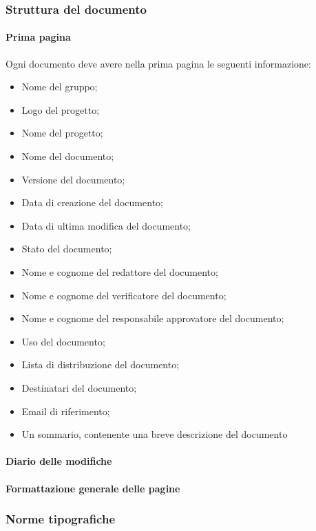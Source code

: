 \subsubsection{Struttura del documento}
\paragraph{Prima pagina}
Ogni documento deve avere nella prima pagina le seguenti informazione:
\begin{itemize}
  \item Nome del gruppo;
  \item Logo del progetto;
  \item Nome del progetto;
  \item Nome del documento;
  \item Versione del documento;
  \item Data di creazione del documento;
  \item Data di ultima modifica del documento;
  \item Stato del documento;
  \item Nome e cognome del redattore del documento;
  \item Nome e cognome del verificatore del documento;
  \item Nome e cognome del responsabile approvatore del documento;
  \item Uso del documento;
  \item Lista di distribuzione del documento;
  \item Destinatari del documento;
  \item Email di riferimento;
  \item Un sommario, contenente una breve descrizione del documento

\end{itemize} 
\paragraph{Diario delle modifiche}

\paragraph{Formattazione generale delle pagine}

\subsubsection{Norme tipografiche}

